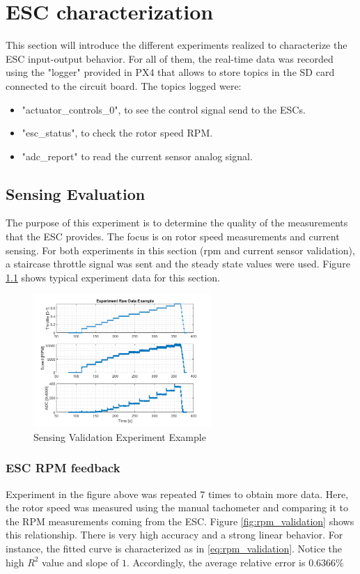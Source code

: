 \chapter{ESC characterization}
This section will introduce the different experiments realized to characterize the ESC input-output behavior. For all of them, the real-time data was recorded using the "logger" provided in PX4 that allows to store topics in the SD card connected to the circuit board. The topics logged were:
\begin{itemize}
	\item "actuator\_controls\_0", to see the control signal send to the ESCs.
	\item "esc\_status", to check the rotor speed RPM.
	\item "adc\_report" to read the current sensor analog signal.
\end{itemize}

\section{Sensing Evaluation}
The purpose of this experiment is to determine the quality of the measurements that the ESC provides. The focus is on rotor speed measurements and current sensing. For both experiments in this section (rpm and current sensor validation), a staircase throttle signal was sent and the steady state values were used. Figure \ref{fig:sensing_validation} shows typical experiment data for this section.

\begin{figure} 
    \centering
    \includegraphics[width=0.6\textwidth]{images/experiment_sample_data.png}
    \caption{Sensing Validation Experiment Example}
    \label{fig:sensing_validation}
\end{figure}

\subsection{ESC RPM feedback}
Experiment in the figure above was repeated 7 times to obtain more data. Here, the rotor speed was measured using the manual tachometer and comparing it to the RPM measurements coming from the ESC. Figure \ref{fig:rpm_validation} shows this relationship. There is very high accuracy and a strong linear behavior. For instance, the fitted curve is characterized as in \ref{eq:rpm_validation}. Notice the high $R^2$ value and slope of $1$. Accordingly, the average relative error is $0.6366\%$

